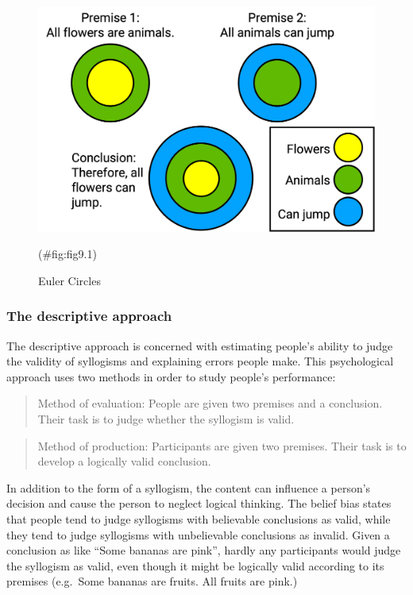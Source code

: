 \documentclass[
]{krantz}
\begin{document}
\begin{figure}

{\centering \includegraphics[width=0.6\linewidth]{images/ch9/fig1} 

}

\caption{Euler Circles}(\#fig:fig9.1)
\end{figure}

\hypertarget{the-descriptive-approach}{%
\subsubsection*{The descriptive approach}\label{the-descriptive-approach}}


The descriptive approach is concerned with estimating people's ability to judge the validity of syllogisms and explaining errors people make. This psychological approach uses two methods in order to study people's performance:

\begin{quote}
Method of evaluation: People are given two premises and a conclusion. Their task is to judge whether the syllogism is valid.
\end{quote}

\begin{quote}
Method of production: Participants are given two premises. Their task is to develop a logically valid conclusion.
\end{quote}

In addition to the form of a syllogism, the content can influence a person's decision and cause the person to neglect logical thinking. The belief bias states that people tend to judge syllogisms with believable conclusions as valid, while they tend to judge syllogisms with unbelievable conclusions as invalid. Given a conclusion as like ``Some bananas are pink'', hardly any participants would judge the syllogism as valid, even though it might be logically valid according to its premises (e.g.~Some bananas are fruits. All fruits are pink.)
\end{document}
